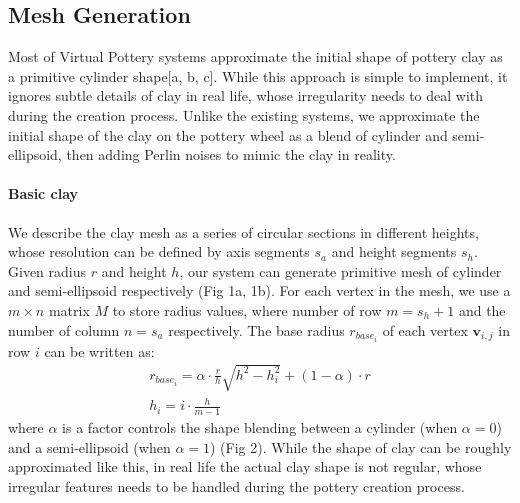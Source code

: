 \subsection{Mesh Generation}
\label{sec:4.1}

Most of Virtual Pottery systems approximate the initial shape of pottery clay as a primitive cylinder shape[a, b, c]. While this approach is simple to implement, it ignores subtle details of clay in real life, whose irregularity needs to deal with during the creation process. Unlike the existing systems, we approximate the initial shape of the clay on the pottery wheel as a blend of cylinder and semi-ellipsoid, then adding Perlin noises to mimic the clay in reality.


\paragraph{Basic clay} We describe the clay mesh as a series of circular sections in different heights, whose resolution can be defined by axis segments $s_{a}$ and height segments $s_{h}$. Given radius $r$ and height $h$, our system can generate primitive mesh of cylinder and semi-ellipsoid respectively (Fig 1a, 1b).
For each vertex in the mesh, we use a $m \times n$ matrix $M$ to store radius values, where number of row $m = s_{h} + 1$ and the number of column $n = s_{a}$ respectively. The base radius $r_{base_{i}}$ of each vertex $\mathbf{v}_{i,j}$ in row $i$ can be written as: 
\begin{equation}
\begin{split}
r_{base_{i}} = \alpha \cdot \frac{r}{h} \sqrt{h^2 -  h_{i}^2} + (1 - \alpha) \cdot r \\
h_{i} = i \cdot \frac{h}{m-1}
\end{split}
\end{equation}
where $\alpha$ is a factor controls the shape blending between a  cylinder (when $\alpha=0$) and a semi-ellipsoid (when $\alpha=1$) (Fig 2).
While the shape of clay can be roughly approximated like this, in real life the actual clay shape is not regular, whose irregular features needs to be handled during the pottery creation process.

